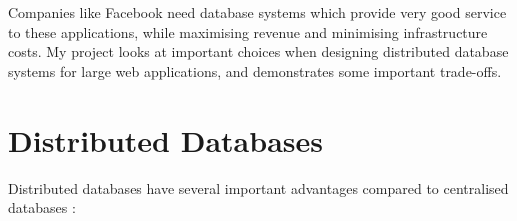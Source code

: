 \documentclass[12pt,a4paper,twoside,openany]{report}
\begin{document}
Companies like Facebook need database systems which provide very good service to these applications, while maximising revenue and minimising infrastructure costs. My project looks at important choices when designing distributed database systems for large web applications, and demonstrates some important trade-offs.

%

\section{Distributed Databases}

Distributed databases have several important advantages compared to centralised databases \cite{lake2013}:
\end{document}
